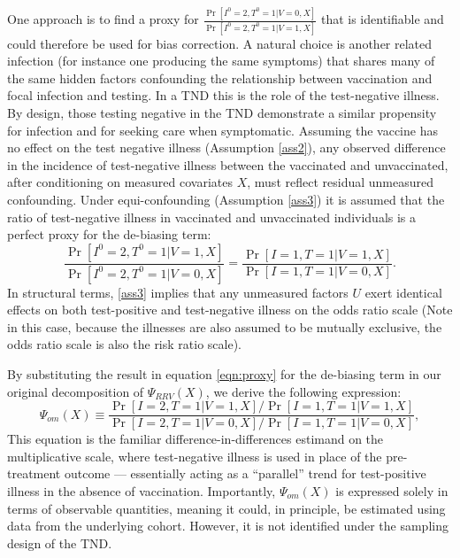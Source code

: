 \documentclass[11pt]{article}
\begin{document}
One approach is to find a proxy for $\frac{\Pr[I^0 = 2, T^0 = 1 | V = 0, X]}{\Pr[I^0 = 2, T^0 = 1 | V = 1, X]}$ that is identifiable and could therefore be used for bias correction. A natural choice is another related infection (for instance one producing the same symptoms) that shares many of the same hidden factors confounding the relationship between vaccination and focal infection and testing. In a TND this is the role of the test-negative illness. By design, those testing negative in the TND demonstrate a similar propensity for infection and for seeking care when symptomatic. Assuming the vaccine has no effect on the test negative illness (Assumption \ref{ass2}), any observed difference in the incidence of test-negative illness between the vaccinated and unvaccinated, after conditioning on measured covariates $X$, must reflect residual unmeasured confounding. Under equi-confounding (Assumption \ref{ass3}) it is assumed that the ratio of test-negative illness in vaccinated and unvaccinated individuals is a perfect proxy for the de-biasing term:
\begin{equation}\label{eqn:proxy}
     \dfrac{\Pr[I^0 = 2, T^0 = 1  | V = 1, X]}{\Pr[I^0 = 2, T^0 = 1 | V = 0, X]} = \frac{\Pr[I = 1, T = 1  | V = 1, X]}{\Pr[I = 1, T = 1  | V = 0, X]}.
\end{equation}
In structural terms, \ref{ass3} implies that any unmeasured factors $U$ exert identical effects on both test-positive and test-negative illness on the odds ratio scale (Note in this case, because the illnesses are also assumed to be mutually exclusive, the odds ratio scale is also the risk ratio scale). 

By substituting the result in equation \ref{eqn:proxy} for the de-biasing term in our original decomposition of $\Psi_{RRV}(X)$, we derive the following expression:
    \begin{equation}\label{eqn:or_estimand}
         \Psi_{om}(X) \equiv \dfrac{\Pr[I = 2, T = 1 | V = 1, X]/\Pr[I = 1, T = 1 | V = 1, X]}{\Pr[I = 2, T = 1 | V = 0, X]/\Pr[I = 1, T = 1 | V = 0, X]},
    \end{equation}
This equation is the familiar difference-in-differences estimand on the multiplicative scale, where test-negative illness is used in place of the pre-treatment outcome --- essentially acting as a ``parallel'' trend for test-positive illness in the absence of vaccination. Importantly, $\Psi_{om}(X)$ is expressed solely in terms of observable quantities, meaning it could, in principle, be estimated using data from the underlying cohort. However, it is not identified under the sampling design of the TND. 
\end{document}
